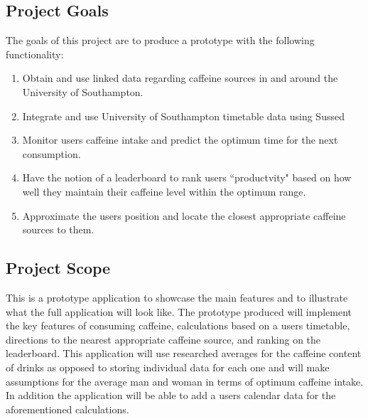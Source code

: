\subsection{Project Goals}
The goals of this project are to produce a prototype with the following functionality: 

\begin{enumerate}
	\item{Obtain and use linked data regarding caffeine sources in and around the University of Southampton.}
	\item{Integrate and use University of Southampton timetable data using Sussed}
	\item{Monitor users caffeine intake and predict the optimum time for the next consumption.}
	\item{Have the notion of a leaderboard to rank users ``productvity" based on how well they maintain their caffeine level within the optimum range.}
	\item{Approximate the users position and locate the closest appropriate caffeine sources to them.}
\end{enumerate}

\subsection{Project Scope}
This is a prototype application to showcase the main features and to illustrate what the full application will look like. 
The prototype produced will implement the key features of consuming caffeine, calculations based on a users timetable, directions to the nearest appropriate caffeine source, and ranking on the leaderboard. 
This application will use researched averages for the caffeine content of drinks as opposed to storing individual data for each one and will make assumptions for the average man and woman in terms of optimum caffeine intake. 
In addition the application will be able to add a users calendar data for the aforementioned calculations. 
